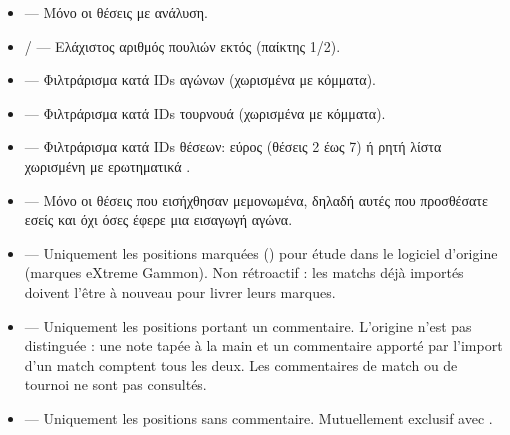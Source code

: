 \documentclass[letterpaper,10pt,greek]{sphinxmanual}
\begin{document}
\begin{itemize}
\item {} 
\sphinxAtStartPar
{} — Μόνο οι θέσεις με ανάλυση.

\item {} 
\sphinxAtStartPar
{} /  — Ελάχιστος αριθμός πουλιών εκτός (παίκτης 1/2).

\item {} 
\sphinxAtStartPar
{} — Φιλτράρισμα κατά IDs αγώνων (χωρισμένα με κόμματα).

\item {} 
\sphinxAtStartPar
{} — Φιλτράρισμα κατά IDs τουρνουά (χωρισμένα με κόμματα).

\item {} 
\sphinxAtStartPar
{} — Φιλτράρισμα κατά IDs θέσεων: εύρος  (θέσεις 2 έως 7) ή ρητή λίστα χωρισμένη με ερωτηματικά .

\item {} 
\sphinxAtStartPar
{} — Μόνο οι θέσεις που εισήχθησαν μεμονωμένα, δηλαδή αυτές που προσθέσατε εσείς και όχι όσες έφερε μια εισαγωγή αγώνα.

\item {} 
\sphinxAtStartPar
{} — Uniquement les positions marquées () pour étude dans
le logiciel d’origine (marques eXtreme Gammon). Non rétroactif : les
matchs déjà importés doivent l’être à nouveau pour livrer leurs marques.

\item {} 
\sphinxAtStartPar
{} — Uniquement les positions portant un commentaire.
L’origine n’est pas distinguée : une note tapée à la main et un commentaire
apporté par l’import d’un match comptent tous les deux. Les commentaires de
match ou de tournoi ne sont pas consultés.

\item {} 
\sphinxAtStartPar
{} — Uniquement les positions sans commentaire. Mutuellement
exclusif avec .

\end{itemize}
\end{document}
